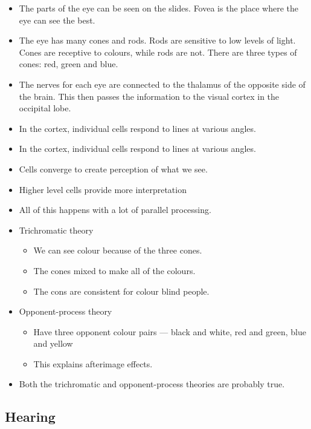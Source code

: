 \documentclass[12pt]{article}
\begin{document}
\begin{itemize}
    \item The parts of the eye can be seen on the slides.  Fovea is the place
        where the eye can see the best.
    \item The eye has many cones and rods.  Rods are sensitive to low levels of
        light.  Cones are receptive to colours, while rods are not. There are
        three types of cones: red, green and blue.
    \item The nerves for each eye are connected to the thalamus of the opposite
        side of the brain. This then passes the information to the visual cortex
        in the occipital lobe.
    \item In the cortex, individual cells respond to lines at various angles.
    \item In the cortex, individual cells respond to lines at various angles.
    \item Cells converge to create perception of what we see.
    \item Higher level cells provide more interpretation
    \item All of this happens with a lot of parallel processing.
    \item Trichromatic theory
        \begin{itemize}
            \item We can see colour because of the three cones.
            \item The cones mixed to make all of the colours.
            \item The cons are consistent for colour blind people.
        \end{itemize}
    \item Opponent-process theory
        \begin{itemize}
            \item Have three opponent colour pairs --- black and white, red and
                green, blue and yellow
            \item This explains afterimage effects.
        \end{itemize}
    \item Both the trichromatic and opponent-process theories are probably true.
\end{itemize}

\subsection{Hearing}
\end{document}
